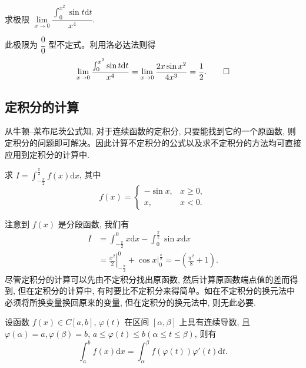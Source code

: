 \begin{example}\label{example:ma-7-4-2}
求极限 $\lim\limits_{x\to0}\dfrac{\int_0^{x^2}\sin t\mathrm dt}{x^4}$.
\end{example}


\begin{solve}
此极限为 $\dfrac{0}{0}$ 型不定式。利用洛必达法则得
\[
  \lim_{x\to0}\frac{\int_0^{x^2}\sin t\mathrm dt}{x^4}
  =\lim_{x\to0}\frac{2x\sin x^2}{4x^3}=\frac{1}{2}.
\qedhere
\]
\end{solve}


\subsection{定积分的计算}
\label{subsec:ma-7-4-2}

从牛顿--莱布尼茨公式知, 对于连续函数的定积分, 只要能找到它的一个原函数, 则定积分的问题即可解决。因此计算不定积分的公式以及求不定积分的方法均可直接应用到定积分的计算中.

\begin{example}\label{example:ma-7-4-3}
求 $I=\int_{-\frac{\pi}{2}}^{\frac{\pi}{2}} f(x)\mathrm dx$, 其中
\[
  f(x)=
  \begin{cases}
    -\sin x, & x\geq0,\\
    x, & x<0.
  \end{cases}
\]
\end{example}


\begin{solve}
注意到 $f(x)$ 是分段函数, 我们有
\[
\begin{aligned}
  I&=\int_{-\frac{\pi}{2}}^0 x\mathrm dx-\int_0^{\frac{\pi}{2}}\sin x\mathrm dx\\
  &=\left.\frac{x^2}{2}\right|_{-\frac{\pi}{2}}^0+\left.\cos x\right|_0^{\frac{\pi}{2}}
  =-\left(\frac{\pi^2}{8}+1\right).
\end{aligned}
\]
尽管定积分的计算可以先由不定积分找出原函数, 然后计算原函数端点值的差而得到, 但在定积分的计算中, 有时要比不定积分来得简单。如在不定积分的换元法中必须将所换变量换回原来的变量, 但在定积分的换元法中, 则无此必要.
\end{solve}


\begin{theorem}[{换元法}]\label{theorem:ma-7-4-2}
设函数 $f(x)\in C[a,b]$, $\varphi(t)$ 在区间 $[\alpha,\beta]$ 上具有连续导数, 且 $\varphi(\alpha)=a,\varphi(\beta)=b$, $a\leq\varphi(t)\leq b(\alpha\leq t\leq\beta)$, 则有
\[
  \int_a^b f(x)\mathrm dx=\int_\alpha^\beta f(\varphi(t))\varphi'(t)\mathrm dt.
\]
\end{theorem}


